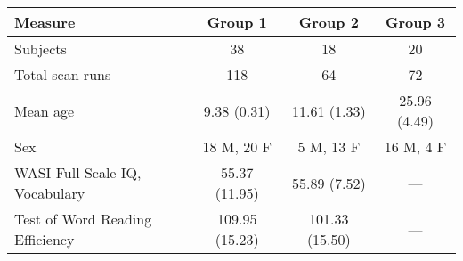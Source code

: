 \begin{tabular}{lccc}
\toprule
Measure &               Group 1 &  Group 2 &              Group 3 \\
\midrule
Subjects                        &              38 &              18 &            20 \\
Total scan runs                 &             118 &              64 &            72 \\
Mean age                        &     9.38 (0.31) &    11.61 (1.33) &  25.96 (4.49) \\
Sex                             &      18 M, 20 F &       5 M, 13 F &     16 M, 4 F \\
WASI Full-Scale IQ, Vocabulary  &   55.37 (11.95) &    55.89 (7.52) &   --- \\
Test of Word Reading Efficiency &  109.95 (15.23) &  101.33 (15.50) &   --- \\
\bottomrule
\end{tabular}